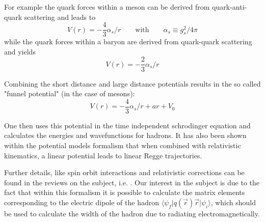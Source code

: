 \documentclass[11pt,a4paper]{article}
\begin{document}
For example the quark forces within a meson can be derived from quark-anti-quark scattering and leads to
\begin{equation}
V(r)=-\frac{4}{3}\alpha_s/r \qquad \text{with} \qquad \alpha_s\equiv g_s^2/4\pi
\end{equation}
while the quark forces within a baryon are derived from quark-quark scattering and yields
\begin{equation}
V(r)=-\frac{2}{3}\alpha_s/r
\end{equation}

Combining the short distance and large distance potentials results in the so called "funnel potential" (in the case of mesons):
\begin{equation}
V(r)=-\frac{4}{3}\alpha_s/r+ar+V_0
\end{equation}

One then uses this potential in the time independent schrodinger equation and calculates the energies and wavefunctions for hadrons. It has also been shown within the potential models formalism that when combined with relativistic kinematics, a linear potential leads to linear Regge trajectories.

Further details, like spin orbit interactions and relativistic corrections can be found in the reviews on the subject, i.e. \cite{LUCHA89}. Our interest in the subject is due to the fact that within this formalism it is possible to calculate the matrix elements corresponding to the electric dipole of the hadron $\langle \psi_f\vert q(\vec{r})\vec{r} \vert \psi_i\rangle$, which should be used to calculate the width of the hadron due to radiating electromagnetically.

\end{document}
